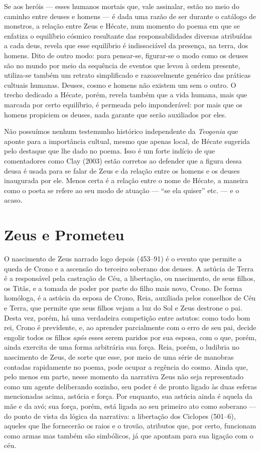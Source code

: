 Se aos heróis --- esses humanos mortais que, vale assinalar, estão no
meio do caminho entre deuses e homens --- é dada uma razão de ser durante
o catálogo de monstros, a relação entre Zeus e Hécate, num momento do
poema em que se enfatiza o equilíbrio cósmico resultante das
responsabilidades diversas atribuídas a cada deus, revela que esse
equilíbrio é indissociável da presença, na terra, dos homens. Dito de
outro modo: para pensar-se, figurar-se o modo como os deuses são no
mundo por meio da sequência de eventos que levou à ordem presente,
utiliza-se também um retrato simplificado e razoavelmente genérico das
práticas cultuais humanas. Deuses, cosmo e homens não existem um sem o
outro. O trecho dedicado a Hécate, porém, revela também que a vida
humana, mais que marcada por certo equilíbrio, é permeada pelo
imponderável: por mais que os homens propiciem os deuses, nada garante
que serão auxiliados por eles.

Não possuímos nenhum testemunho histórico independente da
\textit{Teogonia} que aponte para a importância cultual, mesmo que apenas
local, de Hécate sugerida pelo destaque que lhe dado no poema. Isso é um
forte indício de que comentadores como Clay (2003) estão corretos ao
defender que a figura dessa deusa é usada para se falar de Zeus e da
relação entre os homens e os deuses inaugurada por ele. Menos certa é a
relação entre o nome de Hécate, a maneira como o poeta se refere ao seu
modo de atuação --- ``se ela quiser'' etc. --- e o acaso.

\section{Zeus e Prometeu}

O nascimento de Zeus narrado logo depois (453--91) é o evento que permite
a queda de Crono e a ascensão do terceiro soberano dos deuses. A astúcia
de Terra é a responsável pela castração de Céu, a libertação, ou
nascimento, de seus filhos, os Titãs, e a tomada de
poder por parte do filho mais novo, Crono. De forma homóloga, é a
astúcia da esposa de Crono, Reia, auxiliada pelos conselhos de Céu e
Terra, que permite que seus filhos vejam a luz do Sol e Zeus destrone o
pai. Desta vez, porém, há uma verdadeira competição entre astutos: como
todo bom rei, Crono é previdente, e, ao aprender parcialmente com o
erro de seu pai, decide engolir todos os filhos \textit{após} esses serem
paridos por sua esposa, com o que, porém, ainda exercita de uma forma
arbitrária sua força. Reia, porém, o ludibria no nascimento de Zeus, de
sorte que esse, por meio de uma série de manobras contadas rapidamente
no poema, pode ocupar a regência do cosmo. Ainda que, pelo menos em
parte, nesse momento da narrativa Zeus não seja representado como um
agente deliberando sozinho, seu poder é de pronto ligado às duas esferas
mencionadas acima, astúcia e força. Por enquanto, sua astúcia ainda é
aquela da mãe e da avó; sua força, porém, está ligada ao seu primeiro
ato como soberano --- do ponto de vista da lógica da narrativa: a
libertação dos Ciclopes (501--6), aqueles que lhe fornecerão os raios e o
trovão, atributos que, por certo, funcionam como armas mas também são
simbólicos, já que apontam para sua ligação com o céu.

